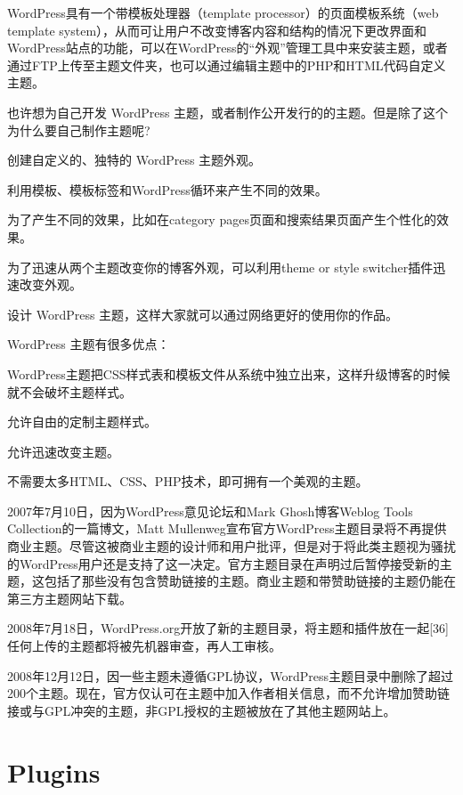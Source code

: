 WordPress具有一个带模板处理器（template processor）的页面模板系统（web template system），从而可让用户不改变博客内容和结构的情况下更改界面和WordPress站点的功能，可以在WordPress的“外观”管理工具中来安装主题，或者通过FTP上传至主题文件夹，也可以通过编辑主题中的PHP和HTML代码自定义主题。


也许想为自己开发 WordPress 主题，或者制作公开发行的的主题。但是除了这个为什么要自己制作主题呢?


\begin{compactitem}
\item 创建自定义的、独特的 WordPress 主题外观。
\item 利用模板、模板标签和WordPress循环来产生不同的效果。
\item 为了产生不同的效果，比如在category pages页面和搜索结果页面产生个性化的效果。
\item 为了迅速从两个主题改变你的博客外观，可以利用theme or style switcher插件迅速改变外观。
\item 设计 WordPress 主题，这样大家就可以通过网络更好的使用你的作品。
\end{compactitem}

WordPress 主题有很多优点：

\begin{compactitem}
\item WordPress主题把CSS样式表和模板文件从系统中独立出来，这样升级博客的时候就不会破坏主题样式。
\item 允许自由的定制主题样式。
\item 允许迅速改变主题。
\item 不需要太多HTML、CSS、PHP技术，即可拥有一个美观的主题。
\end{compactitem}


2007年7月10日，因为WordPress意见论坛和Mark Ghosh博客Weblog Tools Collection的一篇博文，Matt Mullenweg宣布官方WordPress主题目录将不再提供商业主题。尽管这被商业主题的设计师和用户批评，但是对于将此类主题视为骚扰的WordPress用户还是支持了这一决定。官方主题目录在声明过后暂停接受新的主题，这包括了那些没有包含赞助链接的主题。商业主题和带赞助链接的主题仍能在第三方主题网站下载。

2008年7月18日，WordPress.org开放了新的主题目录，将主题和插件放在一起[36]任何上传的主题都将被先机器审查，再人工审核。

2008年12月12日，因一些主题未遵循GPL协议，WordPress主题目录中删除了超过200个主题。现在，官方仅认可在主题中加入作者相关信息，而不允许增加赞助链接或与GPL冲突的主题，非GPL授权的主题被放在了其他主题网站上。


\chapter{Plugins}

